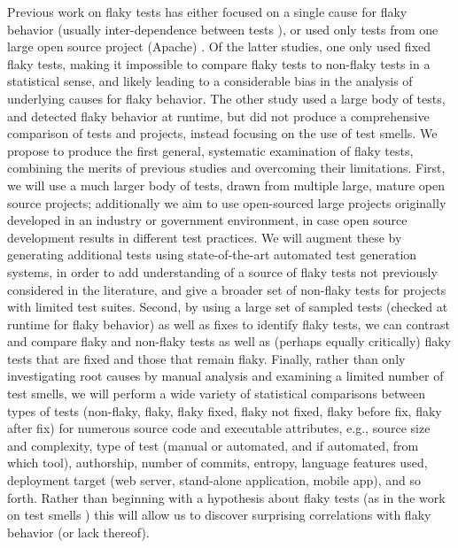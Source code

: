 \documentclass[10pt]{article}
\begin{document}
 Previous work on flaky tests has either focused on a single cause for flaky behavior (usually inter-dependence between tests \cite{LamZE2015}), or used only tests from one large open source project (Apache) \cite{luo2014empirical,palomba2017does}.  Of the latter studies, one \cite{luo2014empirical} only used fixed flaky tests, making it impossible to compare flaky tests to non-flaky tests in a statistical sense, and likely leading to a considerable bias in the analysis of underlying causes for flaky behavior.  The other study \cite{palomba2017does} used a large body of tests, and detected flaky behavior at runtime, but did not produce a comprehensive comparison of tests and projects, instead focusing on the use of test smells.  We propose to produce the first general, systematic examination of flaky tests, combining the merits of previous studies and overcoming their limitations.  First, we will use a much larger body of tests, drawn from multiple large, mature open source projects; additionally we aim to use open-sourced large projects originally developed in an industry or government environment, in case open source development results in different test practices.  We will augment these by generating additional tests using state-of-the-art automated test generation systems, in order to add understanding of a source of flaky tests not previously considered in the literature, and give a broader set of non-flaky tests for projects with limited test suites.  Second, by using a large set of sampled tests (checked at runtime for flaky behavior) as well as fixes to identify flaky tests, we can contrast and compare flaky and non-flaky tests as well as (perhaps equally critically) flaky tests that are fixed and those that remain flaky.  Finally, rather than only investigating root causes by manual analysis and examining a limited number of test smells, we will perform a wide variety of statistical comparisons between types of tests (non-flaky, flaky, flaky fixed, flaky not fixed, flaky before fix, flaky after fix) for numerous source code and executable attributes, e.g., source size and complexity, type of test (manual or automated, and if automated, from which tool), authorship, number of commits, entropy, language features used, deployment target (web server, stand-alone application, mobile app), and so forth.  Rather than beginning with a hypothesis about flaky tests (as in the work on test smells \cite{palomba2017does}) this will allow us to discover surprising correlations with flaky behavior (or lack thereof).
\end{document}
